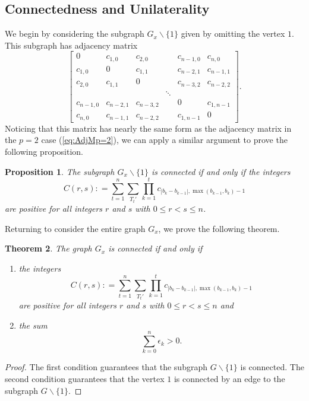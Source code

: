 \documentclass{amsart}
\newtheorem{theorem}{Theorem}[section]
\newtheorem{proposition}[theorem]{Proposition}
\theoremstyle{definition}
\theoremstyle{plain}
\numberwithin{theorem}{section}
\numberwithin{equation}{section}
\numberwithin{figure}{section}
\newcommand{\0}{\langle 0 \rangle }
\begin{document}
\subsection{Connectedness and Unilaterality} \label{sec:Connect&UnilatOdd}

We begin by considering the subgraph $G_x \backslash \{1\}$ given by omitting the vertex $1$. This subgraph has adjacency matrix 
\begin{equation} \label{eq:AdjMpOdd}
\begin{bmatrix}
    0 & c_{1,0} & c_{2,0} & & c_{n-1,0} & c_{n,0} \\
    c_{1,0} & 0 & c_{1,1} & & c_{n-2,1} & c_{n-1,1} \\
    c_{2,0} & c_{1,1} & 0 & & c_{n-3,2} & c_{n-2,2} \\
    &  &  & \ddots & \\
    c_{n-1,0} & c_{n-2,1} & c_{n-3,2} & & 0 & c_{1,n-1} \\
    c_{n,0} & c_{n-1,1} & c_{n-2,2} & & c_{1,n-1} & 0 
\end{bmatrix}.
\end{equation}
Noticing that this matrix has nearly the same form as the adjacency matrix in the $p = 2$ case (\ref{eq:AdjMp=2}), we can apply a similar argument to prove the following proposition. 
\begin{proposition}
    The subgraph $G_x \backslash \{1\}$ is connected if and only if the integers
    \[
    C(r,s) : = \sum_{t = 1}^n \sum_{T_t'} \prod_{k = 1}^t c_{|b_k-b_{k-1}|, \max (b_{k-1}, b_k)-1} 
    \]
    are positive for all integers $r$ and $s$ with $0 \leq r < s \leq n$. 
\end{proposition}

Returning to consider the entire graph $G_x$, we prove the following theorem. 
\begin{theorem} \label{thm:connectedOdd}
    The graph $G_x$ is connected if and only if 
    \begin{enumerate}
        \item the integers 
        \[
        C(r,s) : = \sum_{t = 1}^n \sum_{T_t'} \prod_{k = 1}^t c_{|b_k-b_{k-1}|, \max (b_{k-1}, b_k)-1} 
        \]
        are positive for all integers $r$ and $s$ with $0 \leq r < s \leq n$ and
        \item the sum 
        \[
        \sum_{k=0}^n \epsilon_k > 0.
        \]
    \end{enumerate}
\end{theorem}

\begin{proof}
    The first condition guarantees that the subgraph $G \backslash \{ 1 \}$ is connected. The second condition guarantees that the vertex $1$ is connected by an edge to the subgraph $G \backslash \{ 1\}$.
\end{proof}
\end{document}
